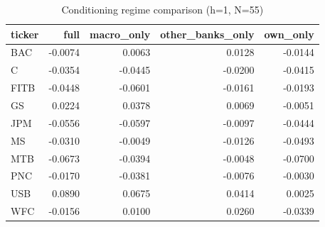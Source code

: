 \begin{table}[ht]
\centering
\caption{Conditioning regime comparison (h=1, N=55)}
\label{tab:regime}
\begin{tabular}{lrrrr}
\toprule
ticker & full & macro_only & other_banks_only & own_only \\
\midrule
BAC & -0.0074 & 0.0063 & 0.0128 & -0.0144 \\
C & -0.0354 & -0.0445 & -0.0200 & -0.0415 \\
FITB & -0.0448 & -0.0601 & -0.0161 & -0.0193 \\
GS & 0.0224 & 0.0378 & 0.0069 & -0.0051 \\
JPM & -0.0556 & -0.0597 & -0.0097 & -0.0444 \\
MS & -0.0310 & -0.0049 & -0.0126 & -0.0493 \\
MTB & -0.0673 & -0.0394 & -0.0048 & -0.0700 \\
PNC & -0.0170 & -0.0381 & -0.0076 & -0.0030 \\
USB & 0.0890 & 0.0675 & 0.0414 & 0.0025 \\
WFC & -0.0156 & 0.0100 & 0.0260 & -0.0339 \\
\bottomrule
\end{tabular}
\end{table}